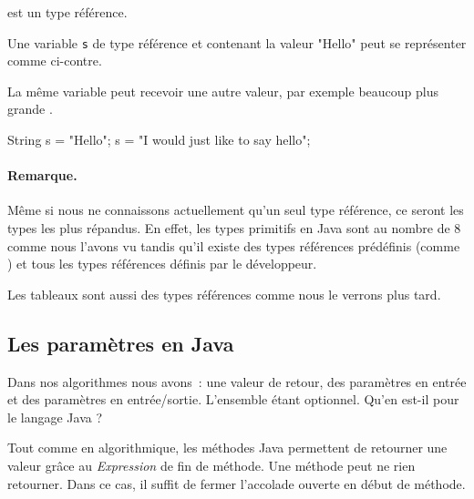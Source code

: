 	 est un type référence. 

	Une variable \texttt{s} de type référence et contenant la valeur "Hello" 
	peut se représenter comme ci-contre. 
	

	La même variable  peut recevoir une autre valeur, par exemple beaucoup
	plus grande . 

	\begin{java}
		String s = "Hello";
		s = "I would just like to say hello";
	\end{java}
		
	\begin{center}
	\end{center}
	
	\paragraph{Remarque.} Même si nous ne connaissons actuellement qu'un seul
	type référence, ce seront les types les plus répandus. En effet, les types
	primitifs en Java sont au nombre de 8 comme nous l'avons vu tandis qu'il
	existe des types références prédéfinis (comme ) et tous les types
	références définis par le développeur.  
	
	Les tableaux sont aussi des types références comme nous le verrons plus tard.
	
	
	
	\subsection{Les paramètres en Java}

	Dans nos algorithmes nous avons~: une valeur de retour, des paramètres en
	entrée et des paramètres en entrée/sortie. L'ensemble étant optionnel. Qu'en
	est-il pour le langage Java ? 

	Tout comme en algorithmique, les méthodes Java permettent de retourner une
	valeur grâce au  \textit{Expression} de fin de méthode. Une
	méthode peut ne rien retourner. Dans ce cas, il suffit de fermer l'accolade
	ouverte en début de méthode.


